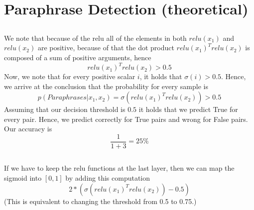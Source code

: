 \documentclass{article}
\begin{document}
\subsection{}


\section{Paraphrase Detection (theoretical)}
\subsection{}
We note that because of the relu all of the elements in both $relu(x_1)$ and $relu(x_2)$ are positive, 
because of that the dot product $relu(x_1)^T relu(x_2)$ is composed of a sum of positive arguments, hence 
$$relu(x_1)^T relu(x_2) > 0.5$$
Now, we note that for every positive scalar $i$, it holds that $\sigma (i) > 0.5$. Hence, we arrive at the conclusion that the probability for every sample is
$$p(Paraphrases|x_1, x_2) = \sigma (relu(x_1)^T relu(x_2)) > 0.5$$
Assuming that our decision threshold is $0.5$ it holds that we predict True for every pair.
Hence, we predict correctly for True pairs and wrong for False pairs. Our accuracy is 
$$\frac{1}{1+3}=25 \% $$
\subsection{}
If we have to keep the relu functions at the last layer, then we can map the sigmoid into $[0,1]$ by adding this computation
$$2*(\sigma (relu(x_1)^T relu(x_2)) - 0.5)$$
(This is equivalent to changing the threshold from 0.5 to 0.75.)
\end{document}

